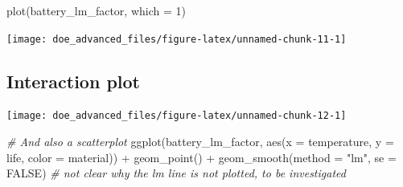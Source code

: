 \documentclass[
]{book}
\newenvironment{Shaded}{\begin{snugshade}}{\end{snugshade}}
\newcommand{\AttributeTok}[1]{\textcolor[rgb]{0.77,0.63,0.00}{#1}}
\newcommand{\CommentTok}[1]{\textcolor[rgb]{0.56,0.35,0.01}{\textit{#1}}}
\newcommand{\ConstantTok}[1]{\textcolor[rgb]{0.00,0.00,0.00}{#1}}
\newcommand{\DecValTok}[1]{\textcolor[rgb]{0.00,0.00,0.81}{#1}}
\newcommand{\FunctionTok}[1]{\textcolor[rgb]{0.00,0.00,0.00}{#1}}
\newcommand{\NormalTok}[1]{#1}
\newcommand{\SpecialCharTok}[1]{\textcolor[rgb]{0.00,0.00,0.00}{#1}}
\newcommand{\StringTok}[1]{\textcolor[rgb]{0.31,0.60,0.02}{#1}}
\begin{document}
\begin{Shaded}
\begin{Highlighting}[]
\FunctionTok{plot}\NormalTok{(battery\_lm\_factor, }\AttributeTok{which =} \DecValTok{1}\NormalTok{)}
\end{Highlighting}
\end{Shaded}

\texttt{[image: doe\_advanced\_files/figure-latex/unnamed-chunk-11-1]}

\hypertarget{interactionPlot}{%
\subsection{Interaction plot}\label{interactionPlot}}

\begin{Shaded}
\end{Shaded}

\texttt{[image: doe\_advanced\_files/figure-latex/unnamed-chunk-12-1]}

\begin{Shaded}
\begin{Highlighting}[]
\CommentTok{\# And also a scatterplot}
\FunctionTok{ggplot}\NormalTok{(battery\_lm\_factor, }\FunctionTok{aes}\NormalTok{(}\AttributeTok{x =}\NormalTok{ temperature, }\AttributeTok{y =}\NormalTok{ life, }\AttributeTok{color =}\NormalTok{ material)) }\SpecialCharTok{+}
  \FunctionTok{geom\_point}\NormalTok{() }\SpecialCharTok{+}
  \FunctionTok{geom\_smooth}\NormalTok{(}\AttributeTok{method =} \StringTok{"lm"}\NormalTok{, }\AttributeTok{se =} \ConstantTok{FALSE}\NormalTok{) }\CommentTok{\# not clear why the lm line is not plotted, to be investigated}
\end{Highlighting}
\end{Shaded}
\end{document}
